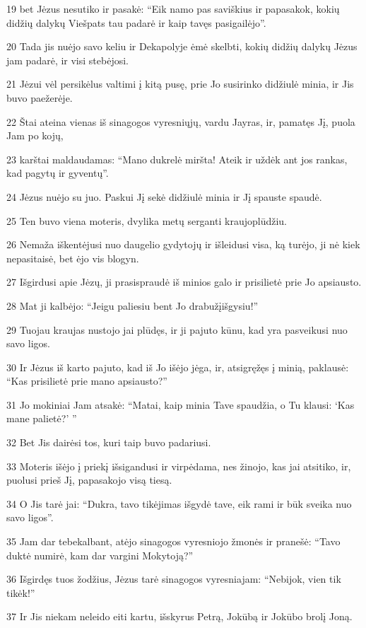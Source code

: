 \par 19 bet Jėzus nesutiko ir pasakė: “Eik namo pas saviškius ir papasakok, kokių didžių dalykų Viešpats tau padarė ir kaip tavęs pasigailėjo”. 
\par 20 Tada jis nuėjo savo keliu ir Dekapolyje ėmė skelbti, kokių didžių dalykų Jėzus jam padarė, ir visi stebėjosi. 
\par 21 Jėzui vėl persikėlus valtimi į kitą pusę, prie Jo susirinko didžiulė minia, ir Jis buvo paežerėje. 
\par 22 Štai ateina vienas iš sinagogos vyresniųjų, vardu Jayras, ir, pamatęs Jį, puola Jam po kojų, 
\par 23 karštai maldaudamas: “Mano dukrelė miršta! Ateik ir uždėk ant jos rankas, kad pagytų ir gyventų”. 
\par 24 Jėzus nuėjo su juo. Paskui Jį sekė didžiulė minia ir Jį spauste spaudė. 
\par 25 Ten buvo viena moteris, dvylika metų serganti kraujoplūdžiu. 
\par 26 Nemaža iškentėjusi nuo daugelio gydytojų ir išleidusi visa, ką turėjo, ji nė kiek nepasitaisė, bet ėjo vis blogyn. 
\par 27 Išgirdusi apie Jėzų, ji prasispraudė iš minios galo ir prisilietė prie Jo apsiausto. 
\par 28 Mat ji kalbėjo: “Jeigu paliesiu bent Jo drabužį­išgysiu!” 
\par 29 Tuojau kraujas nustojo jai plūdęs, ir ji pajuto kūnu, kad yra pasveikusi nuo savo ligos. 
\par 30 Ir Jėzus iš karto pajuto, kad iš Jo išėjo jėga, ir, atsigręžęs į minią, paklausė: “Kas prisilietė prie mano apsiausto?” 
\par 31 Jo mokiniai Jam atsakė: “Matai, kaip minia Tave spaudžia, o Tu klausi: ‘Kas mane palietė?’ ” 
\par 32 Bet Jis dairėsi tos, kuri taip buvo padariusi. 
\par 33 Moteris išėjo į priekį išsigandusi ir virpėdama, nes žinojo, kas jai atsitiko, ir, puolusi prieš Jį, papasakojo visą tiesą. 
\par 34 O Jis tarė jai: “Dukra, tavo tikėjimas išgydė tave, eik rami ir būk sveika nuo savo ligos”. 
\par 35 Jam dar tebekalbant, atėjo sinagogos vyresniojo žmonės ir pranešė: “Tavo duktė numirė, kam dar vargini Mokytoją?” 
\par 36 Išgirdęs tuos žodžius, Jėzus tarė sinagogos vyresniajam: “Nebijok, vien tik tikėk!” 
\par 37 Ir Jis niekam neleido eiti kartu, išskyrus Petrą, Jokūbą ir Jokūbo brolį Joną. 
